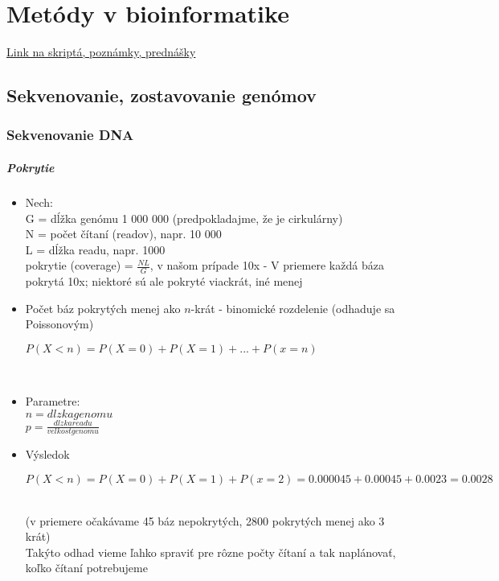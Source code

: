 \chapter[Metódy v bioinformatike]{Metódy v bioinformatike}
\label{metody_v_bioinformatike.tex} %

\href{http://compbio.fmph.uniba.sk/vyuka/mbi/index.php/Predn%C3%A1%C5%A1ky_a_pozn%C3%A1mky}{Link na skriptá, poznámky, prednášky}

	\section{Sekvenovanie, zostavovanie genómov}
		\subsection{Sekvenovanie DNA}
			\paragraph{Pokrytie}
				\begin{itemize}
					\item Nech:\\
					G = dĺžka genómu 1 000 000 (predpokladajme, že je cirkulárny)\\
					N = počet čítaní (readov), napr. 10 000\\
					L = dĺžka readu, napr. 1000\\
					pokrytie (coverage)  = $\frac{NL}{G}$, v našom prípade 10x - V priemere každá báza pokrytá 10x; niektoré sú ale pokryté viackrát, iné menej
					\item Počet báz pokrytých menej ako $n$-krát - binomické rozdelenie (odhaduje sa Poissonovým)\\
					\centerline{$P(X < n) = P(X = 0) + P(X = 1) + ... + P(x = n)$}\\
					\item Parametre:
					\\$n = dlzka genomu$
					\\$p = \frac{dlzka readu}{velkost genomu}$
					\item Výsledok\\
					\centerline{$P(X < n) = P(X = 0) + P(X = 1) + P(x = 2) = 0.000045+0.00045+0.0023=0.0028$}\\
					 (v priemere očakávame 45 báz nepokrytých, 2800 pokrytých menej ako 3 krát)
					\\Takýto odhad vieme ľahko spraviť pre rôzne počty čítaní a tak naplánovať, koľko čítaní potrebujeme
				\end{itemize}

